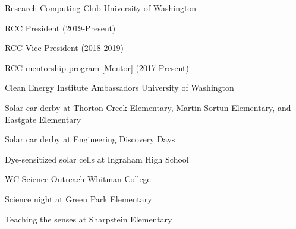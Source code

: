 


\begin{cventries}

\cventry
  {}
  {Research Computing Club} %
  {University of Washington} %
  {}
  {
    \begin{cvitems}
    \item{RCC President (2019-Present)}
    \item{RCC Vice President (2018-2019)}
    \item{RCC mentorship program [Mentor] (2017-Present)}
    \end{cvitems}
  }
   
\cventry
  {}
  {Clean Energy Institute Ambassadors} %
  {University of Washington} %
  {}
  {
    \begin{cvitems}
      \item{Solar car derby at Thorton Creek Elementary, Martin Sortun 
	    Elementary, and Eastgate Elementary}
      \item{Solar car derby at Engineering Discovery Days}
      \item{Dye-sensitized solar cells at Ingraham High School}
    \end{cvitems}
  }

\cventry
  {}
  {WC Science Outreach} %
  {Whitman College} %
  {}
  {
    \begin{cvitems}
      \item{Science night at Green Park Elementary}
      \item{Teaching the senses at Sharpstein Elementary}
    \end{cvitems}
  }

\end{cventries}
